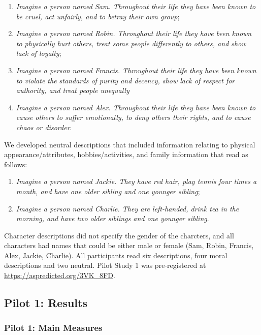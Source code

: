 \documentclass[
  man,floatsintext]{apa6}
\providecommand{\tightlist}{%
  \setlength{\itemsep}{0pt}\setlength{\parskip}{0pt}}
\begin{document}
\begin{enumerate}
\def\labelenumi{(\roman{enumi})}
\tightlist
\item
  \emph{Imagine a person named Sam. Throughout their life they have been known to be cruel, act unfairly, and to betray their own group};
\item
  \emph{Imagine a person named Robin. Throughout their life they have been known to physically hurt others, treat some people differently to others, and show lack of loyalty};
\item
  \emph{Imagine a person named Francis. Throughout their life they have been known to violate the standards of purity and decency, show lack of respect for authority, and treat people unequally}
\item
  \emph{Imagine a person named Alex. Throughout their life they have been known to cause others to suffer emotionally, to deny others their rights, and to cause chaos or disorder}.
\end{enumerate}

We developed neutral descriptions that included information relating to physical appearance/attributes, hobbies/activities, and family information that read as follows:

\begin{enumerate}
\def\labelenumi{(\roman{enumi})}
\tightlist
\item
  \emph{Imagine a person named Jackie. They have red hair, play tennis four times a month, and have one older sibling and one younger sibling};
\item
  \emph{Imagine a person named Charlie. They are left-handed, drink tea in the morning, and have two older siblings and one younger sibling}.
\end{enumerate}

Character descriptions did not specify the gender of the charcters, and all characters had names that could be either male or female (Sam, Robin, Francis, Alex, Jackie, Charlie). All participants read six descriptions, four moral descriptions and two neutral. Pilot Study 1 was pre-registered at \color{blue}\url{https://aspredicted.org/3VK_8FD}\color{black}.

\subsection{Pilot 1: Results}\label{pilot-1-results}

\subsubsection{Pilot 1: Main Measures}\label{pilot-1-main-measures}
\end{document}
